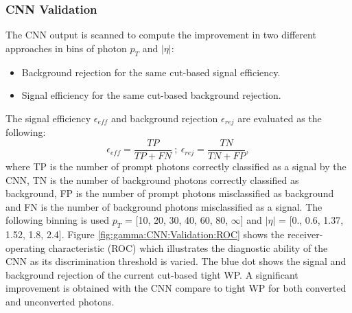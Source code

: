 \subsubsection{CNN Validation}
\label{gamma:CNN:Validation}
The CNN output is scanned to compute the improvement in two different approaches in bins of photon $p_T$ and $|\eta|$: 
\begin{itemize}
    \item Background rejection for the same cut-based signal efficiency.
    \item Signal efficiency for the same cut-based background rejection.
\end{itemize} 
The signal efficiency $\epsilon_{eff}$ and background rejection $\epsilon_{rej}$ are evaluated as the following:
\begin{equation}
    \label{eq:eff}
    \epsilon_{eff} = \frac{TP}{TP+FN} \ ; \ \epsilon_{rej} = \frac{TN}{TN+FP},
\end{equation}
where TP is the number of prompt photons correctly classified as a signal by the CNN, TN is the number of background photons correctly classified as background, FP is the number of prompt photons misclassified as background and FN is the number of background photons misclassified as a signal. The following binning is used $p_T$ = [10, 20, 30, 40, 60, 80, $\infty$] and $|\eta|$ = [0., 0.6, 1.37, 1.52, 1.8, 2.4].
Figure \ref{fig:gamma:CNN:Validation:ROC} shows the receiver-operating characteristic (ROC) which illustrates the diagnostic ability of the CNN as its discrimination threshold is varied. The blue dot shows the signal and background rejection of the current cut-based tight WP. A significant improvement is obtained with the CNN compare to tight WP for both converted and unconverted photons. 
